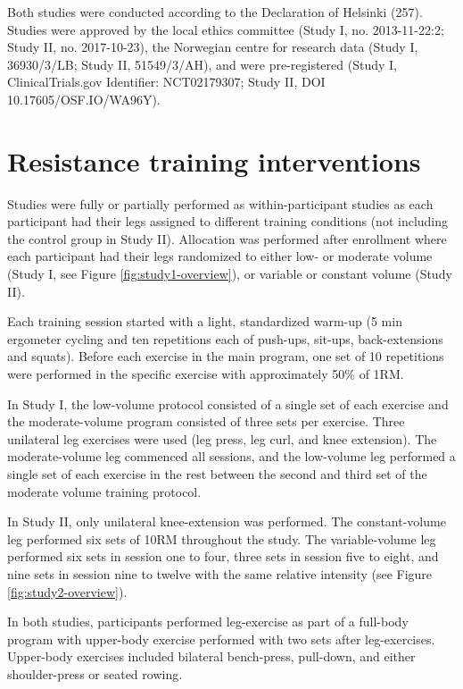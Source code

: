 \documentclass[twoside,10pt]{gihclass} %
\begin{document}
Both studies were conducted according to the Declaration of Helsinki
(257).
Studies were approved by the local ethics committee (Study I, no. 2013-11-22:2; Study II, no. 2017-10-23), the Norwegian centre for research data (Study I, 36930/3/LB; Study II, 51549/3/AH), and were pre-registered (Study I, ClinicalTrials.gov Identifier: NCT02179307; Study II, DOI 10.17605/OSF.IO/WA96Y).

\hypertarget{resistance-training-interventions}{%
\section{Resistance training interventions}\label{resistance-training-interventions}}

Studies were fully or partially performed as within-participant studies
as each participant had their legs assigned to different training
conditions (not including the control group in Study II). Allocation was
performed after enrollment where each participant had their legs
randomized to either low- or moderate volume (Study I, see Figure \ref{fig:study1-overview}), or variable or constant volume (Study II).

Each training session started with a light, standardized warm-up (5 min
ergometer cycling and ten repetitions each of push-ups, sit-ups,
back-extensions and squats). Before each exercise in the main program,
one set of 10 repetitions were performed in the specific exercise with
approximately 50\% of 1RM.

In Study I, the low-volume protocol consisted of a single set of each
exercise and the moderate-volume program consisted of three sets per exercise.
Three unilateral leg exercises were used (leg press, leg curl, and knee
extension). The moderate-volume leg commenced all sessions, and the low-volume leg performed a single set of each exercise in the rest between the second and third set of the moderate volume training protocol.

In Study II, only unilateral knee-extension was performed. The constant-volume leg performed six sets of 10RM throughout the study. The variable-volume leg performed six sets in session one to four, three sets in session five to eight, and nine sets in session nine to twelve with the same relative intensity (see Figure \ref{fig:study2-overview}).

In both studies, participants performed leg-exercise as part of a full-body program with upper-body exercise performed with two sets after leg-exercises. Upper-body exercises included bilateral bench-press, pull-down, and either shoulder-press or seated rowing.
\end{document}
